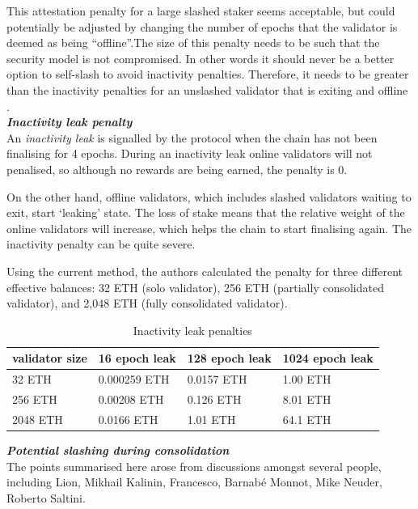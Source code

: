This attestation penalty for a large slashed staker seems acceptable, but could potentially be adjusted by changing the number of epochs that the validator is deemed as being ``offline''.The size of this penalty needs to be such that the security model is not compromised. In other words it should never be a better option to self-slash to avoid inactivity penalties. Therefore, it needs to be greater than the inactivity penalties for an unslashed validator that is exiting and offline \cite{Neuder2023d}. \\

\noindent
\textbf{\textit{Inactivity leak penalty}} \\
An \textit{inactivity leak} is signalled by the protocol when the chain has not been finalising for 4 epochs. During an inactivity leak online validators will not penalised, so although no rewards are being earned, the penalty is 0. 

On the other hand, offline validators, which includes slashed validators waiting to exit, start `leaking' state. The loss of stake means that the relative weight of the online validators will increase, which helps the chain to start finalising again. The inactivity penalty can be quite severe. 

Using the current method, the authors calculated the penalty for three different effective balances: 32 ETH (solo validator), 256 ETH (partially consolidated validator),  and 2,048 ETH (fully consolidated validator).

\begin{table}[htp]
\caption{Inactivity leak penalties}
\begin{center}
\renewcommand{\arraystretch}{1.3}
\begin{tabular}{|l|l|l|l|}
\hline
\textbf{validator size} & \textbf{16 epoch leak} & \textbf{128 epoch leak} & \textbf{1024 epoch leak} \\
\hline
32 ETH & 0.000259 ETH & 0.0157 ETH & 1.00 ETH \\
256 ETH & 0.00208 ETH & 0.126 ETH & 8.01 ETH \\
2048 ETH & 0.0166 ETH & 1.01 ETH & 64.1 ETH \\
\hline
\end{tabular}
\end{center}
\label{default}
\end{table}%

\noindent
\textbf{\textit{Potential slashing during consolidation}} \\
\label{consolidationslashing}
The points summarised here arose from discussions amongst several people, including Lion, Mikhail Kalinin, Francesco, Barnabé Monnot, Mike Neuder, Roberto Saltini.

